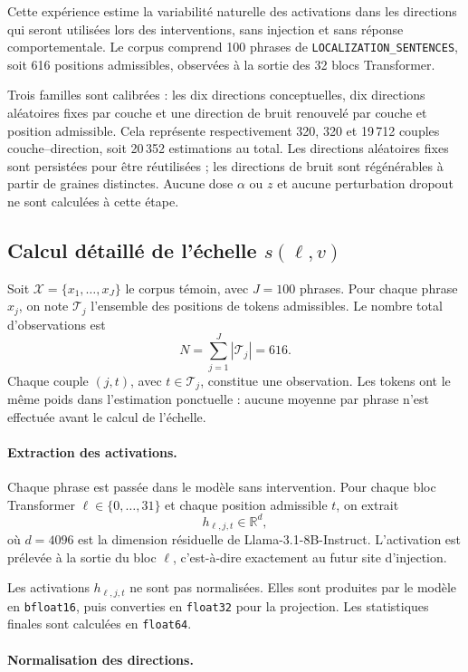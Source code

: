 \documentclass[a4paper,10pt]{article}
\begin{document}
Cette expérience estime la variabilité naturelle des activations dans les
directions qui seront utilisées lors des interventions, sans injection et sans
réponse comportementale. Le corpus comprend 100 phrases de
\texttt{LOCALIZATION\_SENTENCES}, soit 616 positions admissibles, observées à la
sortie des 32 blocs Transformer.

Trois familles sont calibrées : les dix directions conceptuelles, dix directions
aléatoires fixes par couche et une direction de bruit renouvelé par couche et
position admissible. Cela représente respectivement 320, 320 et 19\,712 couples
couche--direction, soit 20\,352 estimations au total. Les directions aléatoires
fixes sont persistées pour être réutilisées ; les directions de bruit sont
régénérables à partir de graines distinctes. Aucune dose $\alpha$ ou $z$ et
aucune perturbation dropout ne sont calculées à cette étape.
\subsection{Calcul détaillé de l'échelle $s(\ell,v)$}

Soit $\mathcal{X}=\{x_1,\ldots,x_J\}$ le corpus témoin, avec $J=100$ phrases.
Pour chaque phrase $x_j$, on note $\mathcal{T}_j$ l'ensemble des positions de
tokens admissibles. Le nombre total d'observations est
\[
N=\sum_{j=1}^{J}|\mathcal{T}_j|=616.
\]
Chaque couple $(j,t)$, avec $t\in\mathcal{T}_j$, constitue une observation.
Les tokens ont le même poids dans l'estimation ponctuelle : aucune moyenne par
phrase n'est effectuée avant le calcul de l'échelle.

\paragraph{Extraction des activations.}

Chaque phrase est passée dans le modèle sans intervention. Pour chaque bloc
Transformer $\ell\in\{0,\ldots,31\}$ et chaque position admissible $t$, on
extrait
\[
h_{\ell,j,t}\in\mathbb{R}^{d},
\]
où $d=4096$ est la dimension résiduelle de Llama-3.1-8B-Instruct.
L'activation est prélevée à la sortie du bloc $\ell$, c'est-à-dire exactement
au futur site d'injection.

Les activations $h_{\ell,j,t}$ ne sont pas normalisées. Elles sont produites
par le modèle en \texttt{bfloat16}, puis converties en \texttt{float32} pour
la projection. Les statistiques finales sont calculées en \texttt{float64}.

\paragraph{Normalisation des directions.}
\end{document}
